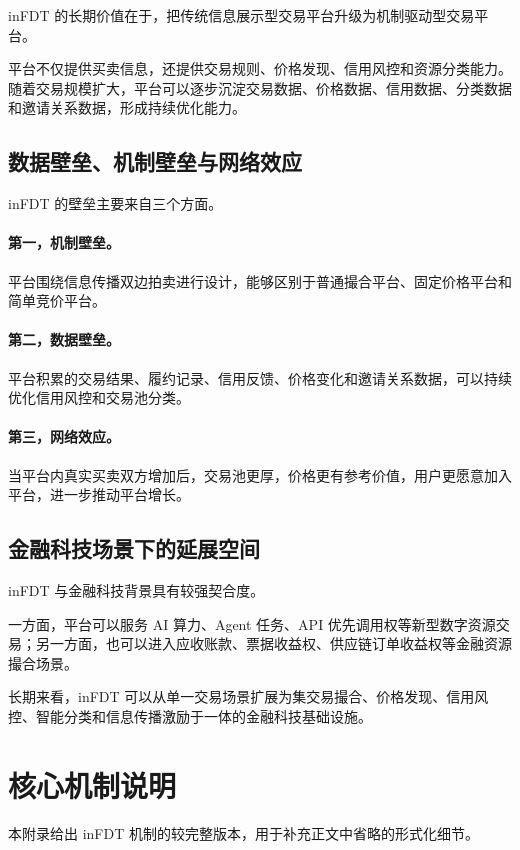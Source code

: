 \documentclass[UTF8,a4paper,12pt]{ctexart}
\begin{document}
inFDT 的长期价值在于，把传统信息展示型交易平台升级为机制驱动型交易平台。

平台不仅提供买卖信息，还提供交易规则、价格发现、信用风控和资源分类能力。随着交易规模扩大，平台可以逐步沉淀交易数据、价格数据、信用数据、分类数据和邀请关系数据，形成持续优化能力。

\subsection{数据壁垒、机制壁垒与网络效应}

inFDT 的壁垒主要来自三个方面。

\paragraph{第一，机制壁垒。}
平台围绕信息传播双边拍卖进行设计，能够区别于普通撮合平台、固定价格平台和简单竞价平台。

\paragraph{第二，数据壁垒。}
平台积累的交易结果、履约记录、信用反馈、价格变化和邀请关系数据，可以持续优化信用风控和交易池分类。

\paragraph{第三，网络效应。}
当平台内真实买卖双方增加后，交易池更厚，价格更有参考价值，用户更愿意加入平台，进一步推动平台增长。

\subsection{金融科技场景下的延展空间}

inFDT 与金融科技背景具有较强契合度。

一方面，平台可以服务 AI 算力、Agent 任务、API 优先调用权等新型数字资源交易；另一方面，也可以进入应收账款、票据收益权、供应链订单收益权等金融资源撮合场景。

长期来看，inFDT 可以从单一交易场景扩展为集交易撮合、价格发现、信用风控、智能分类和信息传播激励于一体的金融科技基础设施。

\appendix

\section{核心机制说明}

本附录给出 inFDT 机制的较完整版本，用于补充正文中省略的形式化细节。
\end{document}
